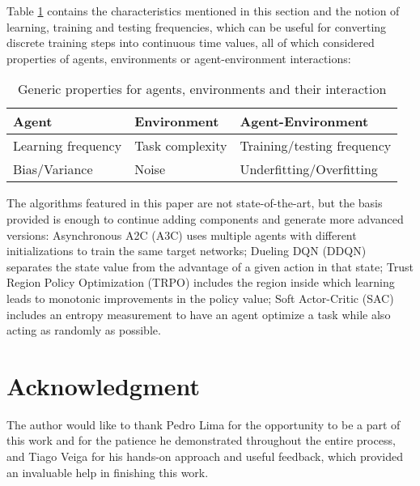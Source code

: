 \documentclass[journal]{IEEEtran}
\begin{document}
	Table \ref{table:PROPS} contains the characteristics mentioned in this section and the notion of learning, training and testing frequencies, which can be useful for converting discrete training steps into continuous time values, all of which considered properties of agents, environments or agent-environment interactions:
		
		\begin{table}[ht!]
			\centering
			
			\begin{tabular}{ m{2.5cm} | m{2.5cm} | m{2.5cm}}
			
				Agent & Environment & Agent-Environment \\
			
				\hline \hline
				Learning frequency & Task complexity & Training/testing frequency \\
			
				\hline
				Bias/Variance & Noise & Underfitting/Overfitting\\
			
			\end{tabular}
			
			\caption{Generic properties for agents, environments and their interaction}
			\label{table:PROPS}
		\end{table}
		
	The algorithms featured in this paper are not state-of-the-art, but the basis provided is enough to continue adding components and generate more advanced versions: Asynchronous A2C (A3C) \cite{babaeizadeh2016ga3c} uses multiple agents with different initializations to train the same target networks; Dueling DQN (DDQN) \cite{wang2016dueling} separates the state value from the advantage of a given action in that state; Trust Region Policy Optimization (TRPO) \cite{schulman2015trust} includes the region inside which learning leads to monotonic improvements in the policy value; Soft Actor-Critic (SAC) \cite{haarnoja2018soft} includes an entropy measurement to have an agent optimize a task while also acting as randomly as possible.

\section*{Acknowledgment}
	The author would like to thank Pedro Lima for the opportunity to be a part of this work and for the patience he demonstrated throughout the entire process, and Tiago Veiga for his hands-on approach and useful feedback, which provided an invaluable help in finishing this work.
\end{document}

